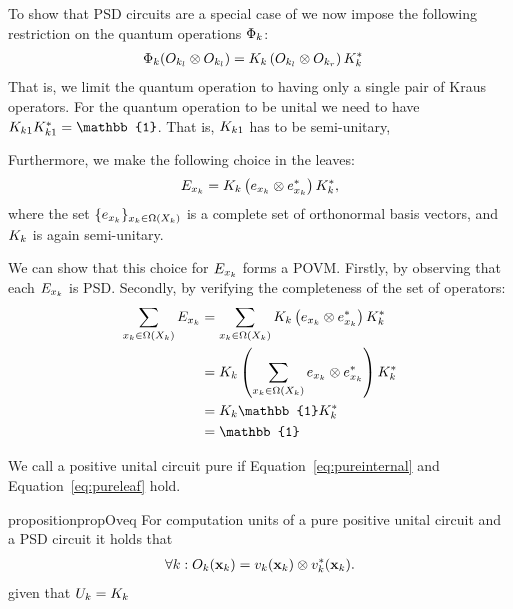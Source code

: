 To show that PSD circuits are a special case of \puncs we now impose the following restriction on the quantum operations $\Phi_k$:
\begin{align}
	\Phi_k (O_{k_l} \otimes O_{k_l} )
	 & =
	K_{k} \left( O_{k_l}  \otimes  O_{k_r} \right) K_{k}^*
	\label{eq:pureinternal}
\end{align}
That is, we limit the quantum operation to having  only a single pair of Kraus operators. For the quantum operation to be unital we need to have $\kraus_{k1} \kraus_{k1}^*=\mathbb{1}$. That is, $K_{k1}$ has to be semi-unitary,

Furthermore, we make the following choice in the leaves:
\begin{align}
	E_{x_k} = K_{k} \left( e_{x_k} \otimes e_{x_k}^* \right) K_{k}^*,
	\label{eq:pureleaf}
\end{align}
where the set  $\{ e_{x_k} \}_{x_k \in \Omega(X_k)}$ is a complete set of orthonormal basis vectors, and $K_{k}$ is again semi-unitary.

We can show that this choice for $E_{x_k}$ forms a POVM. Firstly, by observing that each $E_{x_k}$ is PSD. Secondly, by verifying the completeness of the set of operators:
\begin{align}
	\sum_{\xvar_k \in \Omega(\Xvar_k)} E_{\xvar_k}
	 & = \sum_{\xvar_k \in \Omega(\Xvar_k)} K_{k} \left( e_{\xvar_k} \otimes e_{\xvar_k}^*  \right) K_{k}^*
	\nonumber
	\\
	 & =
	K_{k} \left(  \sum_{\xvar_k \in \Omega(\Xvar_k)}  e_{\xvar_k} \otimes e_{\xvar_k}^*  \right) K_{k}^*
	\nonumber
	\\
	 & =
	K_{k} \mathbb{1} K_{k}^*
	\nonumber
	\\
	 & = \mathbb{1}
\end{align}

\begin{definition}
	We call a positive unital circuit pure if Equation~\ref{eq:pureinternal} and Equation~\ref{eq:pureleaf} hold.
\end{definition}


\begin{restatable}{proposition}{propOveq}
	\label{prop:Oveq}
	For computation units of a pure positive unital circuit and a PSD circuit it holds that
	\label{prop:Oveq}
	\begin{align}
		\forall k: O_k(\mathbf{x}_k) = v_{k}(\mathbf{x}_{k}) \otimes v^*_{k}(\mathbf{x}_{k}).
		\label{eq:def:opvec_equivalent}
	\end{align}
	given that $U_k=K_k$
\end{restatable}

